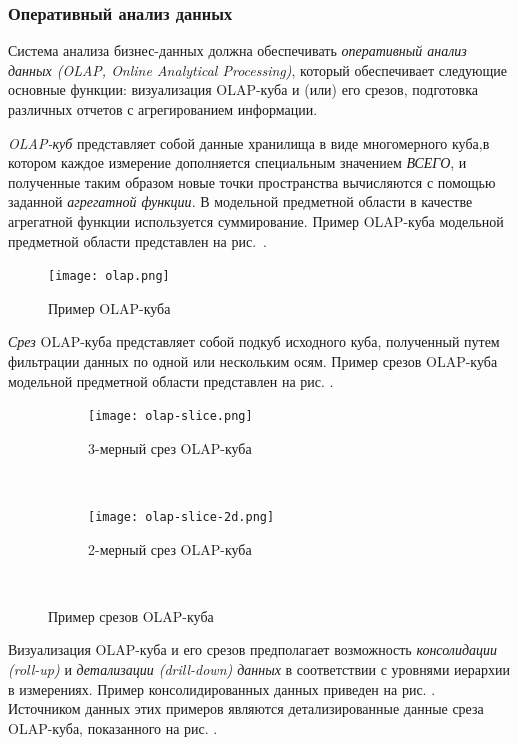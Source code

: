 \subsubsection{Оперативный анализ данных}
Система анализа бизнес-данных должна обеспечивать \textit{оперативный анализ данных (OLAP, Online Analytical Processing)}, который обеспечивает следующие основные функции: визуализация OLAP-куба и (или) его срезов, подготовка различных отчетов с агрегированием информации. \par 
\textit{OLAP-куб} представляет собой данные хранилища в виде многомерного куба,в котором каждое измерение дополняется специальным значением \textit{ВСЕГО}, и полученные таким образом новые точки пространства вычисляются с помощью 
заданной \textit{агрегатной функции}. В модельной предметной области в качестве агрегатной функции используется суммирование. Пример OLAP-куба модельной предметной области представлен на рис.~.

\begin{figure}[h]
  \centering
  \texttt{[image: olap.png]}
  \caption{Пример OLAP-куба}
  \label{olap}
\end{figure}

\textit{Срез} OLAP-куба представляет собой подкуб исходного куба, полученный путем фильтрации данных по одной или нескольким осям. Пример срезов OLAP-куба модельной предметной области представлен на рис. .

\begin{figure}[h]
  \centering
  \begin{subfigure}[h]{\textwidth}
    \texttt{[image: olap-slice.png]}
    \caption{3-мерный срез OLAP-куба}
    \label{olap-slice-3d}
  \end{subfigure} 
  ~
  \begin{subfigure}[h]{\textwidth}
    \texttt{[image: olap-slice-2d.png]}
    \caption{2-мерный срез OLAP-куба}
    \label{olap-slice-2d}
  \end{subfigure}
  ~
  \caption{Пример срезов OLAP-куба}
  \label{olap-slice}
\end{figure}

Визуализация OLAP-куба и его срезов предполагает возможность \textit{консолидации (roll-up)} и \textit{детализации (drill-down) данных} в соответствии с уровнями иерархии в измерениях. Пример консолидированных данных приведен на рис. . Источником данных этих примеров являются детализированные данные среза OLAP-куба, показанного на рис. .

